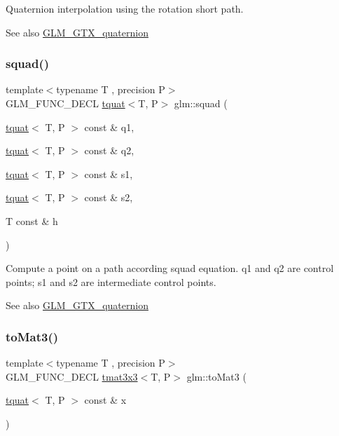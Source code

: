 Quaternion interpolation using the rotation short path.

\begin{DoxySeeAlso}{See also}
\hyperlink{group__gtx__quaternion}{G\+L\+M\+\_\+\+G\+T\+X\+\_\+quaternion} 
\end{DoxySeeAlso}
\mbox{\label{group__gtx__quaternion_gae75f537becdf2b1381b4482ec96e6c82}} 
\subsubsection{\texorpdfstring{squad()}{squad()}}
{\footnotesize\ttfamily template$<$typename T , precision P$>$ \\
G\+L\+M\+\_\+\+F\+U\+N\+C\+\_\+\+D\+E\+CL \hyperlink{structglm_1_1tquat}{tquat}$<$T, P$>$ glm\+::squad (\begin{DoxyParamCaption}\item[{\hyperlink{structglm_1_1tquat}{tquat}$<$ T, P $>$ const \&}]{q1,  }\item[{\hyperlink{structglm_1_1tquat}{tquat}$<$ T, P $>$ const \&}]{q2,  }\item[{\hyperlink{structglm_1_1tquat}{tquat}$<$ T, P $>$ const \&}]{s1,  }\item[{\hyperlink{structglm_1_1tquat}{tquat}$<$ T, P $>$ const \&}]{s2,  }\item[{T const \&}]{h }\end{DoxyParamCaption})}

Compute a point on a path according squad equation. q1 and q2 are control points; s1 and s2 are intermediate control points.

\begin{DoxySeeAlso}{See also}
\hyperlink{group__gtx__quaternion}{G\+L\+M\+\_\+\+G\+T\+X\+\_\+quaternion} 
\end{DoxySeeAlso}
\mbox{\label{group__gtx__quaternion_ga01935b66ba245c2fd7dee5427d86ce9b}} 
\subsubsection{\texorpdfstring{to\+Mat3()}{toMat3()}}
{\footnotesize\ttfamily template$<$typename T , precision P$>$ \\
G\+L\+M\+\_\+\+F\+U\+N\+C\+\_\+\+D\+E\+CL \hyperlink{structglm_1_1tmat3x3}{tmat3x3}$<$T, P$>$ glm\+::to\+Mat3 (\begin{DoxyParamCaption}\item[{\hyperlink{structglm_1_1tquat}{tquat}$<$ T, P $>$ const \&}]{x }\end{DoxyParamCaption})}

